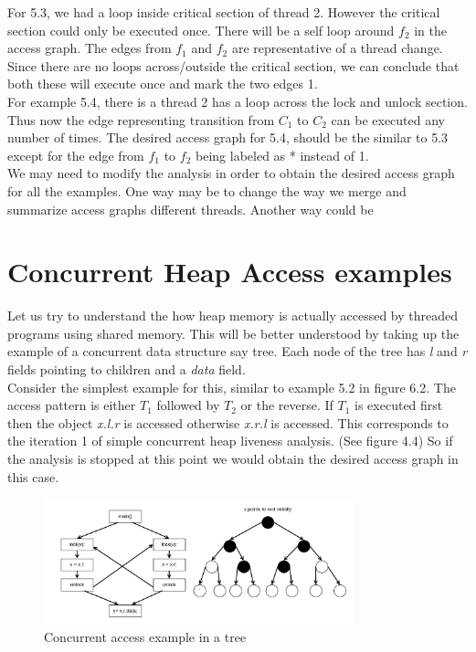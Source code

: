 For 5.3, we had a loop inside critical section of thread 2. However the critical section could only be executed once. There will be a self loop around $f_2$ in the access graph. The edges from $f_1$ and $f_2$ are representative of a thread change. Since there are no loops across/outside the critical section, we can conclude that both these will execute once and mark the two edges 1. \\

For example 5.4, there is a thread 2 has a loop across the lock and unlock section. Thus now the edge representing transition from $C_1$ to $C_2$ can be executed any number of times. The desired access graph for 5.4, should be the similar to 5.3 except for the edge from $f_1$ to $f_2$ being labeled as * instead of 1. \\

We may need to modify the analysis in order to obtain the desired access graph for all the examples. One way may be to change the way we merge and summarize access graphs different threads. Another way could be   

\section{Concurrent Heap Access examples}

Let us try to understand the how heap memory is actually accessed by threaded programs using shared memory. This will be better understood by taking up the example of a concurrent data structure say tree. Each node of the tree has \emph{l} and \emph{r} fields pointing to children and a \emph{data} field. \\

Consider the simplest example for this, similar to example 5.2 in figure 6.2. The access pattern is either $T_1$ followed by $T_2$ or the reverse. If $T_1$ is executed first then the object \emph{x.l.r} is accessed otherwise \emph{x.r.l} is accessed. This corresponds to the iteration 1 of simple concurrent heap liveness analysis. (See figure 4.4) So if the analysis is stopped at this point we would obtain the desired access graph in this case. \\

\begin{figure}
	\centering
	\includegraphics[width=0.8\textwidth]{Figures/tree1.png}
	\caption{Concurrent access example in a tree}
	\label{fig:ch5example}
\end{figure}  

